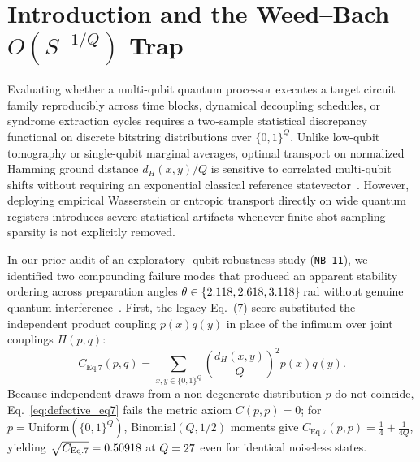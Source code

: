 \documentclass[aps,prapplied,reprint,longbibliography]{revtex4-2}
\begin{document}
\begin{abstract}
\texttt{\WpFezBackend{}} (job \texttt{\WpQecJobId{}}, \WpQecTotalShots{} shots) confirm that split-sample optimal transport cleanly separates genuine hardware decoherence from finite-shot hypercube sparsity.
\end{abstract}

\maketitle

\section{Introduction and the Weed--Bach $O(S^{-1/Q})$ Trap}
\label{sec:intro}

Evaluating whether a multi-qubit quantum processor executes a target circuit family reproducibly across time blocks, dynamical decoupling schedules, or syndrome extraction cycles requires a two-sample statistical discrepancy functional on discrete bitstring distributions over $\{0,1\}^Q$. Unlike low-qubit tomography or single-qubit marginal averages, optimal transport on normalized Hamming ground distance $d_H(x,y)/Q$ is sensitive to correlated multi-qubit shifts without requiring an exponential classical reference statevector~\cite{peyre2019computational,feydy2019interpolating}. However, deploying empirical Wasserstein or entropic transport directly on wide quantum registers introduces severe statistical artifacts whenever finite-shot sampling sparsity is not explicitly removed.

In our prior audit of an exploratory \WpFezQubits{}-qubit robustness study (\texttt{NB-11}), we identified two compounding failure modes that produced an apparent stability ordering across preparation angles $\theta \in \{2.118{}, 2.618{}, 3.118{}\}$\,rad without genuine quantum interference~\cite{davis2026erratum}. First, the legacy Eq.~(7) score substituted the independent product coupling $p(x)q(y)$ in place of the infimum over joint couplings $\Pi(p,q)$:
\begin{equation}
C_{\mathrm{Eq.7}}(p,q) = \sum_{x,y \in \{0,1\}^Q} \left(\frac{d_H(x,y)}{Q}\right)^2 p(x) q(y).
\label{eq:defective_eq7}
\end{equation}
Because independent draws from a non-degenerate distribution $p$ do not coincide, Eq.~\eqref{eq:defective_eq7} fails the metric axiom $C(p,p)=0$; for $p = \mathrm{Uniform}(\{0,1\}^Q)$, $\mathrm{Binomial}(Q, 1/2)$ moments give $C_{\mathrm{Eq.7}}(p,p) = \frac{1}{4} + \frac{1}{4Q}$, yielding $\sqrt{C_{\mathrm{Eq.7}}} = 0.50918{}$ at $Q=27{}$ even for identical noiseless states.
\end{document}
